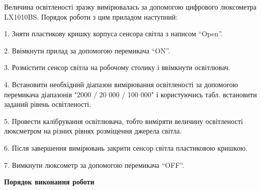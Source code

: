 \documentclass[a4paper,14pt]{extreport}
\begin{document}
Величина освітленості зразку вимірювалась за допомогою цифрового
люксометра LX1010BS. Порядок роботи з цим приладом наступний:

\begin{trivlist}
\item 1. Зняти пластикову кришку корпуса сенсора світла з написом “Open”.
\item 2. Ввімкнути прилад за допомогою перемикача “ON”.
\item 3. Розмістити сенсор світла на робочому столику і ввімкнути освітлювач.
\item 4. Встановити необхідний діапазон вимірювання освітленості за допомогою
перемикача діапазонів "2000 / 20 000 / 100 000" і користуючись табл.
встановити заданий рівень освітленості.
\item 5. Провести калібрування освітлювача, тобто виміряти величину
освітленості люксметром на різних рівнях розміщення джерела світла.
\item 6. Після завершення вимірювань закрити сенсор світла пластиковою
кришкою.
\item 7. Вимкнути люксометр за допомогою перемикача “OFF”.
\end{trivlist}


\begin{center}
\textbf{Порядок виконання роботи}
\end{center}
\end{document}
